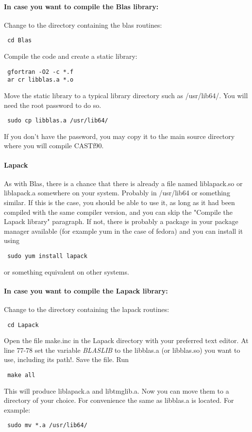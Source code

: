 \documentclass[11p,a4paper]{article}
\begin{document}
\paragraph{In case you want to compile the Blas library:}
Change to the directory containing the blas routines:
\begin{verbatim}
 cd Blas
\end{verbatim}
Compile the code and create a static library:
\begin{verbatim}
 gfortran -O2 -c *.f
 ar cr libblas.a *.o
\end{verbatim}
Move the static library to a typical library directory such as /usr/lib64/. You will need the root password to do so.
\begin{verbatim}
 sudo cp libblas.a /usr/lib64/
\end{verbatim}
If you don't have the password, you may copy it to the main source directory where you will compile CASTf90.

\paragraph{Lapack}
As with Blas, there is a chance that there is already a file named liblapack.so or liblapack.a somewhere on your system. Probably in /usr/lib64 or something similar. If this is the case, you should be able to use it, as long as it had been compiled with the same compiler version, and you can skip the "Compile the Lapack library" paragraph. If not, there is probably a package in your package manager available (for example yum in the case of fedora) and you can install it using
\begin{verbatim}
 sudo yum install lapack
\end{verbatim}
or something equivalent on other systems.

\paragraph{In case you want to compile the Lapack library:}
Change to the directory containing the lapack routines:
\begin{verbatim}
 cd Lapack
\end{verbatim}
Open the file make.inc in the Lapack directory with your preferred text editor.
At line 77-78 set the variable \textit{BLASLIB} to the libblas.a (or libblas.so) you want to use, including its path!. Save the file. Run
\begin{verbatim}
 make all
\end{verbatim}
This will produce liblapack.a and libtmglib.a. Now you can move them to a directory of your choice. For convenience the same as libblas.a is located.
For example:
\begin{verbatim}
 sudo mv *.a /usr/lib64/
\end{verbatim}
\end{document}
